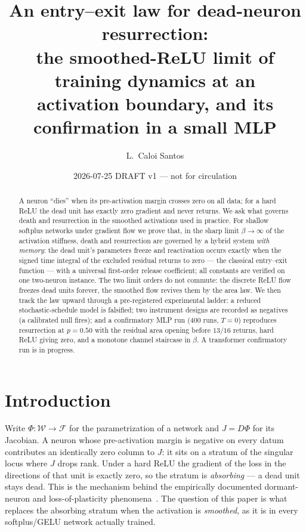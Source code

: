 \documentclass[11pt]{article}
\title{An entry--exit law for dead-neuron resurrection:\\
the smoothed-ReLU limit of training dynamics at an\\
activation boundary, and its confirmation in a small MLP}
\author{L.~Caloi Santos}
\date{2026-07-25 \quad DRAFT v1 --- not for circulation}
\begin{document}
\maketitle

\begin{abstract}
A neuron ``dies'' when its pre-activation margin crosses zero on all data; for a
hard ReLU the dead unit has exactly zero gradient and never returns. We ask what
governs death and resurrection in the smoothed activations used in practice. For
shallow softplus networks under gradient flow we prove that, in the sharp limit
$\beta\to\infty$ of the activation stiffness, death and resurrection are governed
by a hybrid system \emph{with memory}: the dead unit's parameters freeze and
reactivation occurs exactly when the signed time integral of the excluded
residual returns to zero --- the classical entry--exit function --- with a
universal first-order release coefficient; all constants are verified on one
two-neuron instance. The two limit orders do not commute: the discrete ReLU flow
freezes dead units forever, the smoothed flow revives them by the area law. We
then track the law upward through a pre-registered experimental ladder: a reduced
stochastic-schedule model is falsified; two instrument designs are recorded as
negatives (a calibrated null fires); and a confirmatory MLP run ($400$ runs,
$T=0$) reproduces resurrection at $p=0.50$ with the residual area opening before
$13/16$ returns, hard ReLU giving zero, and a monotone channel staircase in
$\beta$. A transformer confirmatory run is in progress.
\end{abstract}

\section{Introduction}\label{sec:intro}

Write $\Phi:\mathcal{W}\to\mathcal{F}$ for the parametrization of a network and
$J=D\Phi$ for its Jacobian. A neuron whose pre-activation margin is negative on
every datum contributes an identically zero column to $J$: it sits on a stratum
of the singular locus where $J$ drops rank. Under a hard ReLU the gradient of the
loss in the directions of that unit is exactly zero, so the stratum is
\emph{absorbing} --- a dead unit stays dead. This is the mechanism behind the
empirically documented dormant-neuron and loss-of-plasticity
phenomena~\cite{Sokar23,Lyle23,Dohare24}. The question of this paper is what
replaces the absorbing stratum when the activation is \emph{smoothed}, as it is
in every softplus/GELU network actually trained.
\end{document}
